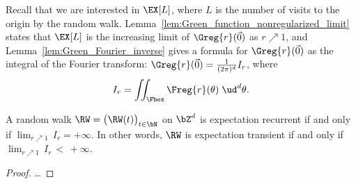 Recall that we are interested in $\EX[L]$, where $L$ is the number of visits to the
origin by the random walk. Lemma~\ref{lem:Green_function_nonregularized_limit}
states that $\EX[L]$ is the increasing limit of $\Greg{r}(\vec{0})$ as $r \nearrow 1$,
and Lemma~\ref{lem:Green_Fourier_inverse} gives a formula for $\Greg{r}(\vec{0})$
as the integral of the Fourier transform: $\Greg{r}(\vec{0}) = \frac{1}{(2\pi)^d} I_r$,
where
\begin{align}
I_r = \iint_{\Fbox} \Freg{r} (\theta) \; \ud^d \theta .
\end{align}

\begin{corollary}
  \label{cor:recurrence_iff_finite_limit_integral}
  A random walk $\RW = \big(\RW(t)\big)_{t \in \bN}$ on $\bZ^d$
  is expectation recurrent if and only if $\lim_{r \nearrow 1} \, I_r = +\infty$.
  In other words, $\RW$ is expectation transient if and only if
  $\lim_{r \nearrow 1} \, I_r \, < \, +\infty$.
\end{corollary}
\begin{proof}
\ldots
\end{proof}



